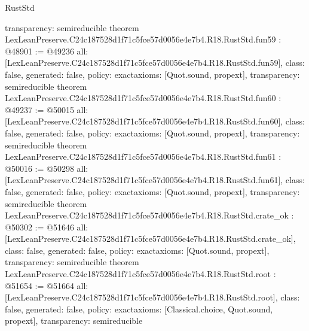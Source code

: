 \begin{lexlean}{RustStd}
\begin{coremodule}
{  transparency: semireducible
}
theorem LexLeanPreserve.C24c187528d1f71c5fce57d0056e4e7b4.R18.RustStd.fun59 : @48901 := @49236 {
  all: [LexLeanPreserve.C24c187528d1f71c5fce57d0056e4e7b4.R18.RustStd.fun59],
  class: false,
  generated: false,
  policy: exact{axioms: [Quot.sound, propext]},
  transparency: semireducible
}
theorem LexLeanPreserve.C24c187528d1f71c5fce57d0056e4e7b4.R18.RustStd.fun60 : @49237 := @50015 {
  all: [LexLeanPreserve.C24c187528d1f71c5fce57d0056e4e7b4.R18.RustStd.fun60],
  class: false,
  generated: false,
  policy: exact{axioms: [Quot.sound, propext]},
  transparency: semireducible
}
theorem LexLeanPreserve.C24c187528d1f71c5fce57d0056e4e7b4.R18.RustStd.fun61 : @50016 := @50298 {
  all: [LexLeanPreserve.C24c187528d1f71c5fce57d0056e4e7b4.R18.RustStd.fun61],
  class: false,
  generated: false,
  policy: exact{axioms: [Quot.sound, propext]},
  transparency: semireducible
}
theorem LexLeanPreserve.C24c187528d1f71c5fce57d0056e4e7b4.R18.RustStd.crate_ok : @50302 := @51646 {
  all: [LexLeanPreserve.C24c187528d1f71c5fce57d0056e4e7b4.R18.RustStd.crate_ok],
  class: false,
  generated: false,
  policy: exact{axioms: [Quot.sound, propext]},
  transparency: semireducible
}
theorem LexLeanPreserve.C24c187528d1f71c5fce57d0056e4e7b4.R18.RustStd.root : @51654 := @51664 {
  all: [LexLeanPreserve.C24c187528d1f71c5fce57d0056e4e7b4.R18.RustStd.root],
  class: false,
  generated: false,
  policy: exact{axioms: [Classical.choice, Quot.sound, propext]},
  transparency: semireducible
}


\end{coremodule}
\end{lexlean}
